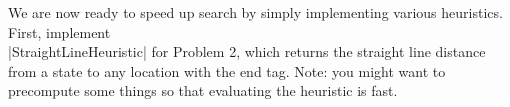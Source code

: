 \item {}

We are now ready to speed up search by simply implementing various heuristics. First, implement \\
|StraightLineHeuristic| for Problem 2, which returns the straight line distance from a state to any location with the end tag. Note: you might want to precompute some things so that evaluating the heuristic is fast.


